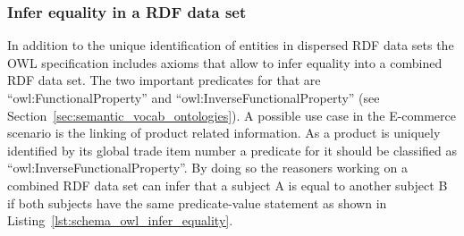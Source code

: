 \subsubsection{Infer equality in a \gls{RDF} data set}
\label{subsub:info_unique_infer}

In addition to the unique identification of entities in dispersed \gls{RDF} data sets the \gls{OWL} specification includes axioms that allow to infer equality into a combined \gls{RDF} data set. The two important predicates for that are ``owl:FunctionalProperty'' and ``owl:InverseFunctionalProperty'' (see Section~\ref{sec:semantic_vocab_ontologies}). A possible use case in the \gls{E-commerce} scenario is the linking of product related information. As a product is uniquely identified by its global trade item number a predicate for it should be classified as ``owl:InverseFunctionalProperty''. By doing so the reasoners working on a combined \gls{RDF} data set can infer that a subject A is equal to another subject B if both subjects have the same predicate-value statement as shown in Listing~\ref{lst:schema_owl_infer_equality}. \@



